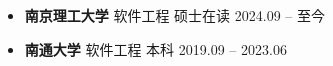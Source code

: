 \documentclass[zh]{resume}
\begin{document}
\makeheader

\begin{abstract}
南京理工大学软件工程硕士在读，主要做 LLM Agent 和 AI 应用工程。参与 JF-AIX 企业级 Agent 平台研发，负责 Agent Runtime 上下文工程，落地会话级文档记忆、跨会话长期记忆与产品数据闭环；独立设计并实现教辅教材智能解析与 AI 质检平台，完成教材 PDF 解析、自动切题、AI 质检、人工校对和入库流程。实习中参与航天领域模型管理平台，负责语义检索、推荐和监控模块。
\end{abstract}

\begin{itemize}
  \item \textbf{南京理工大学} \textbullet{} 软件工程 \textbullet{} 硕士在读 \hfill 2024.09 -- 至今
  \item \textbf{南通大学} \textbullet{} 软件工程 \textbullet{} 本科 \hfill 2019.09 -- 2023.06
\end{itemize}
\end{document}
